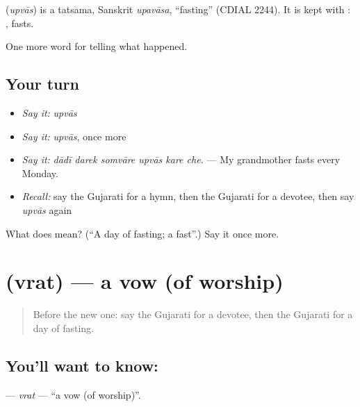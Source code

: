 \begin{cousinweb}
\textbf{} (\emph{upvās}) is a tatsama, Sanskrit \emph{upavāsa}, \textquotedblleft{}fasting\textquotedblright{} (CDIAL 2244). It is kept with \textbf{}: \textbf{  }, fasts.
\end{cousinweb}

\begin{grammarlens}[title={What you've built}]
One more word for telling what happened.
\end{grammarlens}

\subsection*{Your turn}
\begin{itemize}
\raggedright
  \item \emph{Say it:} \emph{upvās}
  \item \emph{Say it:} \emph{upvās}, once more
  \item \emph{Say it:} \emph{dādī darek somvāre upvās kare che.} — My grandmother fasts every Monday.
  \item \emph{Recall:} say the Gujarati for a hymn, then the Gujarati for a devotee, then say \emph{upvās} again
\end{itemize}

\begin{tcolorbox}[breakable,colback=teal!4,colframe=teal!35!black,title={Before you move on}]
What does  mean? (\textquotedblleft{}A day of fasting; a fast\textquotedblright{}.) Say it once more.
\end{tcolorbox}
\section[\texorpdfstring{\gu{વ્રત} (vrat)}{વ્રત (vrat)}]{ (vrat) — a vow (of worship)}

\label{lesson:GU-C331-vrat}



\begin{quote}
Before the new one: say the Gujarati for a devotee, then the Gujarati for a day of fasting.
\end{quote}

\subsection*{You'll want to know: }
\textbf{} — \emph{vrat} — \textquotedblleft{}a vow (of worship)\textquotedblright{}.

